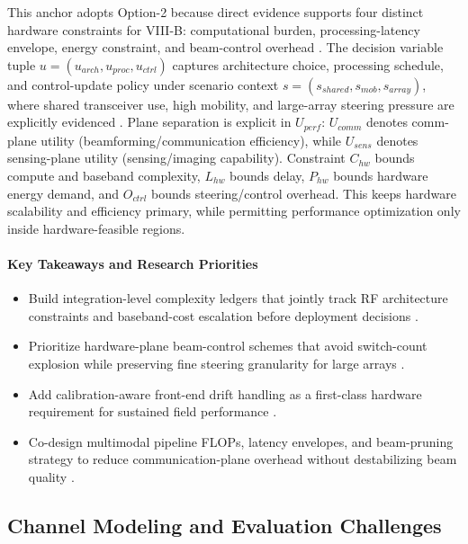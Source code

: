 \documentclass[lettersize,journal]{IEEEtran}
\begin{document}
This anchor adopts Option-2 because direct evidence supports four distinct hardware constraints for VIII-B: computational burden, processing-latency envelope, energy constraint, and beam-control overhead \cite{O_ISAC_134, O_ISAC_161, O_ISAC_171}. The decision variable tuple $u=(u_{arch},u_{proc},u_{ctrl})$ captures architecture choice, processing schedule, and control-update policy under scenario context $s=(s_{shared},s_{mob},s_{array})$, where shared transceiver use, high mobility, and large-array steering pressure are explicitly evidenced \cite{O_ISAC_134, O_ISAC_161, O_ISAC_171}. Plane separation is explicit in $U_{perf}$: $U_{comm}$ denotes comm-plane utility (beamforming/communication efficiency), while $U_{sens}$ denotes sensing-plane utility (sensing/imaging capability). Constraint $C_{hw}$ bounds compute and baseband complexity, $L_{hw}$ bounds delay, $P_{hw}$ bounds hardware energy demand, and $O_{ctrl}$ bounds steering/control overhead. This keeps hardware scalability and efficiency primary, while permitting performance optimization only inside hardware-feasible regions.

\paragraph{Key Takeaways and Research Priorities}
\begin{itemize}
    \item Build integration-level complexity ledgers that jointly track RF architecture constraints and baseband-cost escalation before deployment decisions \cite{O_ISAC_161, O_ISAC_162}.
    \item Prioritize hardware-plane beam-control schemes that avoid switch-count explosion while preserving fine steering granularity for large arrays \cite{O_ISAC_171}.
    \item Add calibration-aware front-end drift handling as a first-class hardware requirement for sustained field performance \cite{O_ISAC_162}.
    \item Co-design multimodal pipeline FLOPs, latency envelopes, and beam-pruning strategy to reduce communication-plane overhead without destabilizing beam quality \cite{O_ISAC_134}.
\end{itemize}

\subsection{Channel Modeling and Evaluation Challenges}
\end{document}
